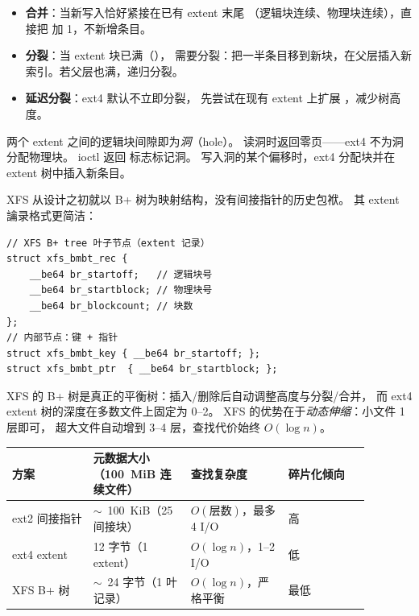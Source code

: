\begin{filesystemlayout}

\begin{itemize}\tightlist
\item \textbf{合并}：当新写入恰好紧接在已有 extent 末尾
  （逻辑块连续、物理块连续），直接把  加 1，不新增条目。
\item \textbf{分裂}：当 extent 块已满（），
  需要分裂：把一半条目移到新块，在父层插入新索引。若父层也满，递归分裂。
\item \textbf{延迟分裂}：ext4 默认不立即分裂，
  先尝试在现有 extent 上扩展 ，减少树高度。
\end{itemize}


两个 extent 之间的逻辑块间隙即为\emph{洞}（hole）。
读洞时返回零页——ext4 不为洞分配物理块。
 ioctl 返回  标志标记洞。
写入洞的某个偏移时，ext4 分配块并在 extent 树中插入新条目。


XFS 从设计之初就以 B+ 树为映射结构，没有间接指针的历史包袱。
其 extent 讑录格式更简洁：

\begin{lstlisting}
// XFS B+ tree 叶子节点（extent 记录）
struct xfs_bmbt_rec {
    __be64 br_startoff;   // 逻辑块号
    __be64 br_startblock; // 物理块号
    __be64 br_blockcount; // 块数
};
// 内部节点：键 + 指针
struct xfs_bmbt_key { __be64 br_startoff; };
struct xfs_bmbt_ptr  { __be64 br_startblock; };
\end{lstlisting}

XFS 的 B+ 树是真正的平衡树：插入/删除后自动调整高度与分裂/合并，
而 ext4 extent 树的深度在多数文件上固定为 0--2。
XFS 的优势在于\emph{动态伸缩}：小文件 1 层即可，
超大文件自动增到 3--4 层，查找代价始终 $O(\log n)$。


\begin{longtable}{|F{0.20\linewidth}|F{0.24\linewidth}|F{0.24\linewidth}|F{0.20\linewidth}|}
\toprule
{}
\textbf{方案} & \textbf{元数据大小（100~MiB 连续文件）} & \textbf{查找复杂度} & \textbf{碎片化倾向} \\
\midrule
ext2 间接指针  & $\sim$~100~KiB（25 间接块）  & $O(\text{层数})$，最多 4 I/O & 高 \\\tablerowrule
ext4 extent   & 12 字节（1 extent）          & $O(\log n)$，1--2 I/O        & 低 \\\tablerowrule
XFS B+ 树     & $\sim$~24 字节（1 叶记录）   & $O(\log n)$，严格平衡        & 最低 \\
\bottomrule
\end{longtable}


\end{filesystemlayout}
